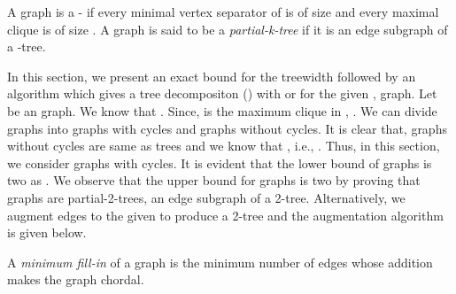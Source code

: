 \documentclass[runningheads]{llncs}
\begin{document}
\begin{definition}
A graph is a - if every minimal vertex separator of  is of size  and every maximal clique is of size . A graph  is said to be a \emph{partial-k-tree} if it is an edge subgraph of a -tree.
\end{definition}

In this section, we present an exact bound for the treewidth followed by an algorithm which gives a tree decompositon () with  or  for the given , graph. Let  be an  graph. We know that . Since,  is the maximum clique in , . We can divide  graphs into  graphs with cycles and  graphs without cycles. It is clear that,  graphs without cycles are same as trees and we know that , i.e., . Thus, in this section, we consider  graphs with cycles. It is evident that the lower bound of  graphs is two as . We observe that the upper bound for  graphs is two by proving that  graphs are partial-2-trees, an edge subgraph of a 2-tree. Alternatively, we augment edges to the given  to produce a 2-tree and the augmentation algorithm is given below.

\begin{definition}
A \emph{minimum fill-in} of a graph  is the minimum number of edges whose addition makes the graph  chordal.
\end{definition}

\begin{algorithm}
\caption{}
\begin{algorithmic}[1]
		\ENDIF
\ENDFOR
{}
\end{algorithmic}
\label{alg:partial2tree}
\end{algorithm}
\end{document}
